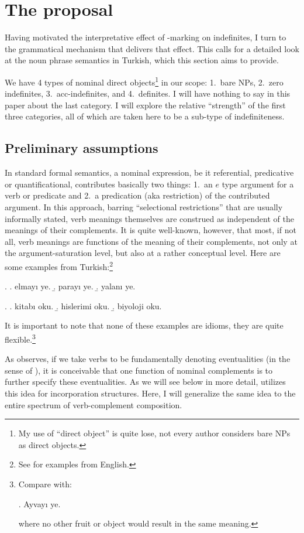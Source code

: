 \documentclass[11pt,a4paper]{article}
\begin{document}
\section{The proposal}

Having motivated the interpretative effect of \acc-marking on indefinites, I turn to the grammatical mechanism that delivers that effect. This calls for a detailed look at the noun phrase semantics in Turkish, which this section aims to provide.

We have 4 types of nominal direct objects\footnote{My use of ``direct object'' is quite lose, not every author considers bare NPs as direct objects.} in our scope: 1.\ bare NPs, 2.\ zero indefinites, 3.\ acc-indefinites, and 4.\ definites. I will have nothing to say in this paper about the last category. I will explore the relative ``strength'' of the first three categories, all of which are taken here to be a sub-type of indefiniteness. 

\subsection{Preliminary assumptions}

In standard formal semantics, a nominal expression, be it referential, predicative or quantificational, contributes basically two things: 1.\ an $e$ type argument for a verb or predicate and 2.\ a predication (aka restriction) of the contributed argument. In this approach, barring ``selectional restrictions'' that are usually informally stated, verb meanings themselves are construed as independent of the meanings of their complements. It is quite well-known, however, that most, if not all, verb meanings are functions of the meaning of their complements, not only at the argument-saturation level, but also at a rather conceptual level. Here are some examples from Turkish:\footnote{See  for examples from English.}

\ex.
\a. elmayı ye.
\b. parayı ye.
\b. yalanı ye.

\ex.
\a. kitabı oku.
\b. hislerimi oku.
\b. biyoloji oku.


It is important to note that none of these examples are idioms, they are quite flexible.\footnote{Compare with:

\ex. Ayvayı ye.

where no other fruit or object would result in the same meaning.
}

As  observes, if we take verbs to be fundamentally denoting eventualities (in the sense of ), it is conceivable that one function of nominal complements is to further specify these eventualities. As we will see below in more detail,  utilizes this idea for incorporation structures. Here, I will generalize the same idea to the entire spectrum of verb-complement composition.
\end{document}
